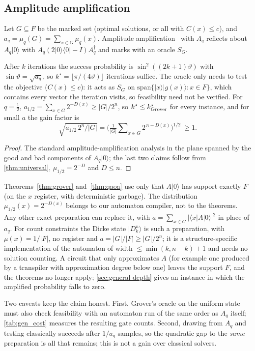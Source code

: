 \subsection{Amplitude amplification}\label{sec:grover}
Let $G\subseteq F$ be the marked set (optimal solutions, or all with $C(x)\le c$), and $a_q=\mu_q(G)=\sum_{x\in G}\mu_q(x)$. Amplitude amplification~\cite{bhmt2002} with $A_q$ reflects about $A_q|0\rangle$ with $A_q(2|0\rangle\langle0|-I)A_q^\dagger$ and marks with an oracle $S_G$.
\begin{theorem}\label{thm:grover}
After $k$ iterations the success probability is $\sin^2((2k+1)\vartheta)$ with $\sin\vartheta=\sqrt{a_q}$, so $k^\star=\lfloor\pi/(4\vartheta)\rfloor$ iterations suffice. The oracle only needs to test the objective ($C(x)\le c$): it acts as $S_G$ on $\mathrm{span}\{|x\rangle|g(x)\rangle:x\in F\}$, which contains every vector the iteration visits, so feasibility need not be verified. For $q=\tfrac12$, $a_{1/2}=\sum_{x\in G}2^{-D(x)}\ge|G|/2^n$, so $k^\star\le k^\star_{\rm Grover}$ for every instance, and for small $a$ the gain factor is
\[
\sqrt{a_{1/2}\,2^n/|G|}=\Big(\tfrac{1}{|G|}\sum\nolimits_{x\in G}2^{\,n-D(x)}\Big)^{1/2}\ \ge1 .
\]
\end{theorem}
\begin{proof}
The standard amplitude-amplification analysis in the plane spanned by the good and bad components of $A_q|0\rangle$; the last two claims follow from \cref{thm:universal}, $\mu_{1/2}=2^{-D}$ and $D\le n$.
\end{proof}
\begin{remark}\label{rem:anyA}
Theorems~\ref{thm:grover} and~\ref{thm:qaoa} use only that $A|0\rangle$ has support exactly $F$ (on the $x$ register, with deterministic garbage). The distribution $\mu_{1/2}(x)=2^{-D(x)}$ belongs to our automaton compiler, not to the theorems. Any other exact preparation can replace it, with $a=\sum_{x\in G}|\langle x|A|0\rangle|^2$ in place of $a_q$. For count constraints the Dicke state $|D^n_k\rangle$ is such a preparation, with $\mu(x)=1/|F|$, no register and $a=|G|/|F|\ge|G|/2^n$; it is a structure-specific implementation of the automaton of width $\le\min(k,n-k)+1$ and needs no solution counting. A circuit that only approximates $A$ (for example one produced by a transpiler with approximation degree below one) leaves the support $F$, and the theorems no longer apply; \cref{sec:general-depth} gives an instance in which the amplified probability falls to zero.
\end{remark}
Two caveats keep the claim honest. First, Grover's oracle on the uniform state must also check feasibility with an automaton run of the same order as $A_q$ itself; \cref{tab:gen_cost} measures the resulting gate counts. Second, drawing from $A_q$ and testing classically succeeds after $1/a_q$ samples, so the quadratic gap to the \emph{same} preparation is all that remains; this is not a gain over classical solvers.
